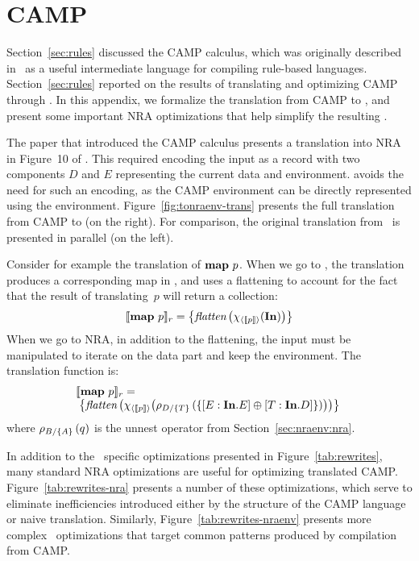 \section{CAMP}
\label{sec:CAMP}

Section~\ref{sec:rules} discussed the CAMP calculus, which was
originally described in~\cite{ShinnarSH15} as a useful intermediate
language for compiling rule-based languages.  Section~\ref{sec:rules}
reported on the results of translating and optimizing CAMP through
\NRAEnv.  In this appendix, we formalize the translation from CAMP to
\NRAEnv, and present some important NRA optimizations that help
simplify the resulting \NRAEnv.

The paper that introduced the CAMP calculus presents a translation
into NRA in Figure~10 of \cite{ShinnarSH15}. This required encoding
the input as a record with two components $D$ and $E$ representing the
current data and environment.  \NRAEnv avoids the need for such an
encoding, as the CAMP environment can be directly represented using
the \NRAEnv environment.  Figure~\ref{fig:tonraenv-trans} presents the
full translation from CAMP to \NRAEnv (on the right). For comparison,
the original translation from~\cite{ShinnarSH15} is presented in
parallel (on the left).

Consider for example the translation of $\rmap{p}$. When we go to
\NRAEnv, the translation produces a corresponding map in \NRAEnv, and
uses a flattening to account for the fact that the result of
translating~$p$ will return a collection:
$$
\pton{\rmap{p} } = \left\{\opflatten\left(\qmap{\ntop{p}}{\qID}\right)\right\}
$$
When we go to NRA, in addition to the flattening, the input must be manipulated
to iterate on the data part and keep
the environment. The translation function is:
$$
\begin{array}{l}
\hspace*{-0.1cm}\pton{\rmap{p}} =
\\
  \left\{\opflatten\left(\qmap{\ntop{p}}{\quntwo{T}{D}{\{[E:\qID.E]\opconcat[T:\qID.D]\}}}\right)\right\}
\end{array}
$$
where $\quntwo{A}{B}{q}$ is the unnest operator from
Section~\ref{sec:nraenv:nra}.

In addition to the \NRAEnv\ specific optimizations presented
in Figure~\ref{tab:rewrites}, many standard NRA optimizations are useful for
optimizing translated CAMP.  Figure~\ref{tab:rewrites-nra} presents a
number of these optimizations, which serve to eliminate inefficiencies introduced either by
the structure of the CAMP language or naive translation.  Similarly,
Figure~\ref{tab:rewrites-nraenv} presents more complex \NRAEnv\
optimizations that target common patterns produced by compilation
from CAMP.
\balance

